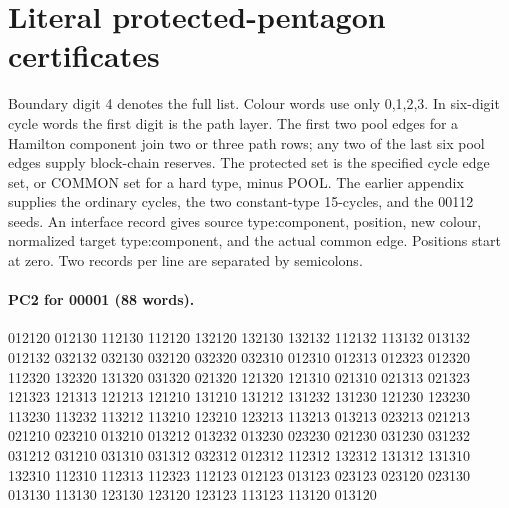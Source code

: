\documentclass[11pt]{article}
\theoremstyle{remark}
\numberwithin{equation}{section}
\numberwithin{table}{section}
\begin{document}
\section{Literal protected-pentagon certificates}
\label{app:protected-pentagon-words}
Boundary digit 4 denotes the full list. Colour words use only 0,1,2,3.
In six-digit cycle words the first digit is the path layer.
The first two pool edges for a Hamilton component join two or three
path rows; any two of the last six pool edges supply block-chain reserves.
The protected set is the specified cycle edge set, or COMMON set
for a hard type, minus POOL. The earlier appendix supplies the
ordinary cycles, the two constant-type 15-cycles, and the 00112 seeds.
An interface record gives source type:component, position, new colour,
normalized target type:component, and the actual common edge.
Positions start at zero. Two records per line are separated by semicolons.
\paragraph{PC2 for 00001 (88 words).}
\begingroup\footnotesize\ttfamily\begin{flushleft}
012120 012130 112130 112120 132120 132130 132132 112132 113132 013132\\
012132 032132 032130 032120 032320 032310 012310 012313 012323 012320\\
112320 132320 131320 031320 021320 121320 121310 021310 021313 021323\\
121323 121313 121213 121210 131210 131212 131232 131230 121230 123230\\
113230 113232 113212 113210 123210 123213 113213 013213 023213 021213\\
021210 023210 013210 013212 013232 013230 023230 021230 031230 031232\\
031212 031210 031310 031312 032312 012312 112312 132312 131312 131310\\
132310 112310 112313 112323 112123 012123 013123 023123 023120 023130\\
013130 113130 123130 123120 123123 113123 113120 013120\\
\end{flushleft}\endgroup
\end{document}
